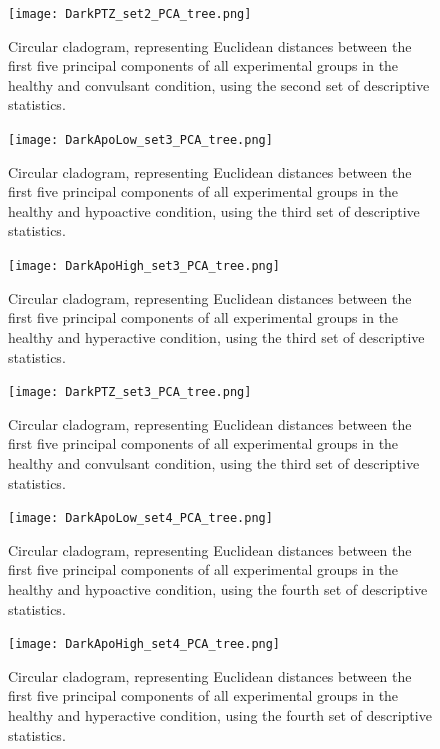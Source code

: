 \documentclass[a4paper,12pt]{article}
\begin{document}
\begin{figure}[h!]
\begin{center}
\texttt{[image: DarkPTZ\_set2\_PCA\_tree.png]}
\caption{Circular cladogram, representing Euclidean distances between the first five principal components of all experimental groups in the healthy and convulsant condition, using the second set of descriptive statistics.}
\end{center}
\end{figure}
\begin{figure}[h!]
\begin{center}
\texttt{[image: DarkApoLow\_set3\_PCA\_tree.png]}
\caption{Circular cladogram, representing Euclidean distances between the first five principal components of all experimental groups in the healthy and hypoactive condition, using the third set of descriptive statistics.}
\end{center}
\end{figure}
\begin{figure}[h!]
\begin{center}
\texttt{[image: DarkApoHigh\_set3\_PCA\_tree.png]}
\caption{Circular cladogram, representing Euclidean distances between the first five principal components of all experimental groups in the healthy and hyperactive condition, using the third set of descriptive statistics.}
\end{center}
\end{figure}
\begin{figure}[h!]
\begin{center}
\texttt{[image: DarkPTZ\_set3\_PCA\_tree.png]}
\caption{Circular cladogram, representing Euclidean distances between the first five principal components of all experimental groups in the healthy and convulsant condition, using the third set of descriptive statistics.}
\end{center}
\end{figure}
\begin{figure}[h!]
\begin{center}
\texttt{[image: DarkApoLow\_set4\_PCA\_tree.png]}
\caption{Circular cladogram, representing Euclidean distances between the first five principal components of all experimental groups in the healthy and hypoactive condition, using the fourth set of descriptive statistics.}
\end{center}
\end{figure}
\begin{figure}[h!]
\begin{center}
\texttt{[image: DarkApoHigh\_set4\_PCA\_tree.png]}
\caption{Circular cladogram, representing Euclidean distances between the first five principal components of all experimental groups in the healthy and hyperactive condition, using the fourth set of descriptive statistics.}
\end{center}
\end{figure}
\end{document}
